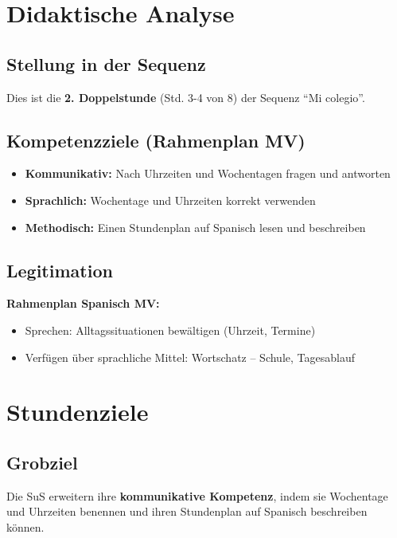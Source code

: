 \documentclass[11pt,a4paper]{article}
\newcommand{\reihenthema}{Mi colegio}
\begin{document}
\section{Didaktische Analyse}

\subsection{Stellung in der Sequenz}
Dies ist die \textbf{2. Doppelstunde} (Std. 3-4 von 8) der Sequenz ``\reihenthema''.

\subsection{Kompetenzziele (Rahmenplan MV)}
\begin{itemize}
    \item \textbf{Kommunikativ:} Nach Uhrzeiten und Wochentagen fragen und antworten
    \item \textbf{Sprachlich:} Wochentage und Uhrzeiten korrekt verwenden
    \item \textbf{Methodisch:} Einen Stundenplan auf Spanisch lesen und beschreiben
\end{itemize}

\subsection{Legitimation}
\textbf{Rahmenplan Spanisch MV:}
\begin{itemize}
    \item Sprechen: Alltagssituationen bewältigen (Uhrzeit, Termine)
    \item Verfügen über sprachliche Mittel: Wortschatz -- Schule, Tagesablauf
\end{itemize}

\section{Stundenziele}

\subsection{Grobziel}
Die SuS erweitern ihre \textbf{kommunikative Kompetenz}, indem sie Wochentage und Uhrzeiten benennen und ihren Stundenplan auf Spanisch beschreiben können.
\end{document}
